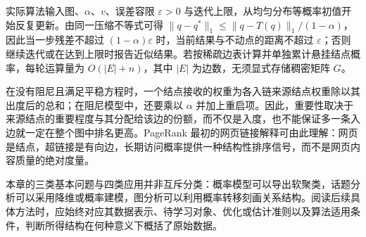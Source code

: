 实际算法输入图、$\alpha$、$v$、误差容限 $\varepsilon>0$ 与迭代上限，从均匀分布等概率初值开始反复更新。由同一压缩不等式可得 $\|q-q^*\|_1\leq\|q-T(q)\|_1/(1-\alpha)$，因此当一步残差不超过 $(1-\alpha)\varepsilon$ 时，当前结果与不动点的距离不超过 $\varepsilon$；否则继续迭代或在达到上限时报告近似结果。若按稀疏边表计算并单独累计悬挂结点概率，每轮运算量为 $O(|E|+n)$，其中 $|E|$ 为边数，无须显式存储稠密矩阵 $G$。

在没有阻尼且满足平稳方程时，一个结点接收的权重为各入链来源结点权重除以其出度后的总和；在阻尼模型中，还要乘以 $\alpha$ 并加上重启项。因此，重要性取决于来源结点的重要程度与其分配给该边的份额，而不仅是入度，也不能保证多一条入边就一定在整个图中排名更高。PageRank 最初的网页链接解释可由此理解：网页是结点，超链接是有向边，长期访问概率提供一种结构性排序信号，而不是网页内容质量的绝对度量。

本章的三类基本问题与四类应用并非互斥分类：概率模型可以导出软聚类，话题分析可以采用降维或概率建模，图分析可以利用概率转移刻画关系结构。阅读后续具体方法时，应始终对应其数据表示、待学习对象、优化或估计准则以及算法适用条件，判断所得结构在何种意义下概括了原始数据。





